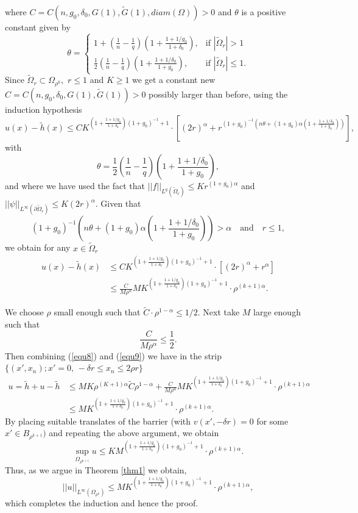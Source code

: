 \documentclass[11pt, leqno]{article}
\theoremstyle{definition}
\theoremstyle{remark}
\numberwithin{equation}{section}
\begin{document}
where $C=C(n,g_0,\delta_0,G(1),\tilde{G}(1),diam(\Omega))>0$ and $\theta$ is a positive constant given by
 $$\theta=
   \begin{cases}
    1+\left(\frac{1}{n}-\frac{1}{q}\right)\left(1+ \frac{1+1/g_0}{1+\delta_0} \right), & \text{if } |\tilde{\Omega}_r| > 1 \\
    \frac{1}{2}\left(\frac{1}{n}-\frac{1}{q}\right)\left(1+\frac{1+1/\delta_0}{1+g_0}\right), & \text{if } |\tilde{\Omega}_r| \leq 1.
   \end{cases}
    $$
Since $\tilde{\Omega}_r\subset \Omega_{\rho^k},$ $r\leq 1$ and $K\geq 1$ we get a constant new $C=C(n,g_0,\delta_0,G(1),\tilde{G}(1))>0$ possibly larger than before, using the induction hypothesis
$$u(x)-\tilde{h}(x) \leq CK^{\left(1+\frac{1+1/g_0}{1+\delta_0}\right)(1+g_0)^{-1}+1}\cdot\left[ (2r)^\alpha + r^{(1+g_0)^{-1}\left(n\theta + (1+g_0)\alpha\left(1+\frac{1+1/\delta_0}{1+g_0} \right) \right)}\right], $$
with  $$\theta= \frac{1}{2}\left(\frac{1}{n}-\frac{1}{q}\right)\left(1+\frac{1+1/\delta_0}{1+g_0}\right),$$ 
and  where we have used the fact that $||f||_{L^q(\tilde{\Omega}_r)}\leq Kr^{(1+g_0)\alpha}$ and  $||\psi||_{L^\infty(\partial\tilde{\Omega}_r)}\leq K(2r)^\alpha.$
Given that
$$(1+g_0)^{-1}\left(n\theta + (1+g_0)\alpha\left(1+\frac{1+1/\delta_0}{1+g_0} \right) \right)>\alpha\quad\text{and}\quad r\leq 1, $$
we obtain for any $x\in \tilde{\Omega}_r$ 
\begin{equation}\label{equ9}
    \begin{aligned}
        u(x)-\tilde{h}(x) &\leq CK^{\left(1+\frac{1+1/g_0}{1+\delta_0}\right)(1+g_0)^{-1}+1}\cdot\left[(2r)^\alpha + r^\alpha \right]\\
        &\leq \frac{C}{M\rho^\alpha}MK^{\left(1+\frac{1+1/g_0}{1+\delta_0}\right)(1+g_0)^{-1}+1}\cdot\rho^{(k+1)\alpha}.
    \end{aligned}
\end{equation}

We choose $\rho$ small enough such that $\tilde{C}\cdot\rho^{1-\alpha}\leq 1/2.$ Next take $M$ large enough such that
$$\frac{C}{M\rho^\alpha}\leq \frac{1}{2}.   $$
Then combining (\ref{equ8}) and (\ref{equ9}) we have in the strip $\{(x',x_n); x'=0,\,-\delta r\leq x_n\leq 2\rho r\}$
\begin{align*}
    u =\tilde{h}+ u-\tilde{h} &\leq MK\rho^{(K+1)\alpha}\tilde{C}\rho^{1-\alpha} + \frac{C}{M\rho^\alpha}MK^{\left(1+\frac{1+1/g_0}{1+\delta_0}\right)(1+g_0)^{-1}+1}\cdot\rho^{(k+1)\alpha}\\
    &\leq MK^{\left(1+\frac{1+1/g_0}{1+\delta_0}\right)(1+g_0)^{-1}+1}\cdot\rho^{(k+1)\alpha}.
\end{align*}
By placing suitable translates of the barrier (with $v(x',-\delta r)=0$ for some $x'\in B_{\rho^{k+1}})$ and repeating the above argument, we obtain
$$\sup_{\Omega_{\rho^{k+1}}}u \leq KM^{\left(1+\frac{1+1/g_0}{1+\delta_0}\right)(1+g_0)^{-1}+1}\cdot\rho^{(k+1)\alpha}. $$
Thus, as we argue in Theorem \ref{thm1} we obtain,
$$||u||_{L^\infty(\Omega_{\rho^k})}\leq MK^{\left(1+\frac{1+1/g_0}{1+\delta_0}\right)(1+g_0)^{-1}+1}\cdot\rho^{(k+1)\alpha},$$
which completes the induction and hence the proof.
\end{document}
